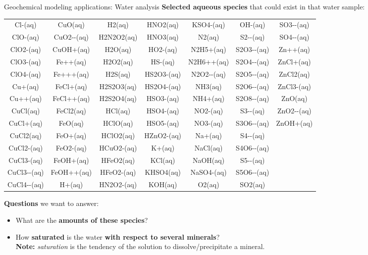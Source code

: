 %
\begin{frame}{Geochemical modeling applications: Water analysis}
\textbf{Selected aqueous species} that could exist in that water sample:
\vskip 1pt
{\scriptsize%
\begin{tabular*}{1\columnwidth}{@{\extracolsep{\fill}}ccccccc}
Cl-(aq) & CuO(aq) & H2(aq) & HNO2(aq) & KSO4-(aq) & OH-(aq) & SO3-{}-(aq)
\tabularnewline
ClO-(aq) & CuO2-{}-(aq) & H2N2O2(aq) & HNO3(aq) & N2(aq) & S2-{}-(aq) & SO4-{}-(aq)\tabularnewline
ClO2-(aq) & CuOH+(aq) & H2O(aq) & HO2-(aq) & N2H5+(aq) & S2O3-{}-(aq) & Zn++(aq)\tabularnewline
ClO3-(aq) & Fe++(aq) & H2O2(aq) & HS-(aq) & N2H6++(aq) & S2O4-{}-(aq) & ZnCl+(aq)\tabularnewline
ClO4-(aq) & Fe+++(aq) & H2S(aq) & HS2O3-(aq) & N2O2-{}-(aq) & S2O5-{}-(aq) & ZnCl2(aq)\tabularnewline
Cu+(aq) & FeCl+(aq) & H2S2O3(aq) & HS2O4-(aq) & NH3(aq) & S2O6-{}-(aq) & ZnCl3-(aq)\tabularnewline
Cu++(aq) & FeCl++(aq) & H2S2O4(aq) & HSO3-(aq) & NH4+(aq) & S2O8-{}-(aq) & ZnO(aq)\tabularnewline
CuCl(aq) & FeCl2(aq) & HCl(aq) & HSO4-(aq) & NO2-(aq) & S3-{}-(aq) & ZnO2-{}-(aq)\tabularnewline
CuCl+(aq) & FeO(aq) & HClO(aq) & HSO5-(aq) & NO3-(aq) & S3O6-{}-(aq) & ZnOH+(aq)\tabularnewline
CuCl2(aq) & FeO+(aq) & HClO2(aq) & HZnO2-(aq) & Na+(aq) & S4-{}-(aq) & \tabularnewline
CuCl2-(aq) & FeO2-(aq) & HCuO2-(aq) & K+(aq) & NaCl(aq) & S4O6-{}-(aq) & \tabularnewline
CuCl3-(aq) & FeOH+(aq) & HFeO2(aq) & KCl(aq) & NaOH(aq) & S5-{}-(aq) & \tabularnewline
CuCl3-{}-(aq) & FeOH++(aq) & HFeO2-(aq) & KHSO4(aq) & NaSO4-(aq) & S5O6-{}-(aq) & \tabularnewline
CuCl4-{}-(aq) & H+(aq) & HN2O2-(aq) & KOH(aq) & O2(aq) & SO2(aq) & \tabularnewline
\end{tabular*}}

\pause
\vskip 5pt
\alert{\textbf{Questions}} we want to answer: 
\begin{itemize}
\item What are the \textbf{amounts of these species}? 
\item How \textbf{saturated} is the water \textbf{with respect to several minerals}? \\
\textbf{Note:}  \emph{saturation} is the tendency of the solution to dissolve/precipitate a mineral.
\end{itemize}
\end{frame}

